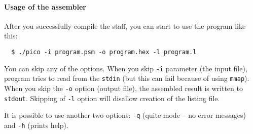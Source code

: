 \documentclass[10pt,a4paper]{article}
\begin{document}
\paragraph{Usage of the assembler}
After you successfully compile the staff, you can start to use the program like this:
\begin{verbatim}
  $ ./pico -i program.psm -o program.hex -l program.l
\end{verbatim}
You can skip any of the options. When you skip \texttt{-i} parameter (the input file), program tries to read from the \texttt{stdin}
	(but this can fail because of using \texttt{mmap}). When you skip the \texttt{-o} option (output file), the assembled result
	is written to \texttt{stdout}. Skipping of \texttt{-l} option will disallow creation of the listing file.

	It is possible to use another two options: \texttt{-q} (quite mode -- no error messages) and \texttt{-h} (prints help).
\end{document}
